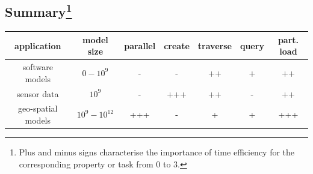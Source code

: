 \subsection*{Summary\footnote{Plus and minus signs characterise the importance of time efficiency for the corresponding property or task from 0 to 3.}}
\begin{tabular}{|c||c|c|c|c|c|c|}
\hline
\bf{application} & \bf{model size} & \bf{parallel} & \bf{create} & \bf{traverse} & \bf{query} & \bf{part. load} \\
\hline\hline
software models & $0-10^9$ & - & - & ++ & + & ++ \\
\hline
sensor data & $10^9$ & - & +++ & ++ & - & ++ \\
\hline
geo-spatial models & $10^9-10^{12}$ & +++ & - & + & + & +++ \\
\hline
\end{tabular}



